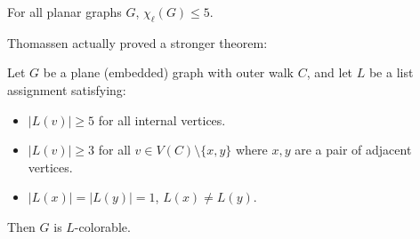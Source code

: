 \begin{theorem}
\label{thomassentheorem}
For all planar graphs $G$, $\chi_{\ell}(G) \leq 5$.
\end{theorem}

Thomassen actually proved a stronger theorem: 

\begin{theorem}
\label{thomassenstrongertheorem}
	Let $G$ be a plane (embedded) graph with outer walk $C$, and let $L$ be a list assignment satisfying:
\begin{itemize}
	\item $|L(v)| \geq 5$ for all internal vertices.
	\item $|L(v)| \geq 3$ for all $v \in V(C) \setminus \{x, y\}$ where $x, y$ are a pair of adjacent vertices.
	\item $|L(x)| = |L(y)| = 1$, $L(x) \neq L(y)$. 
\end{itemize}	
	Then $G$ is $L$-colorable.
\end{theorem}

